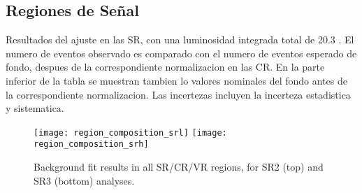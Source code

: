 


\subsection{Regiones de Señal}


\begin{table}[!htbp]
  \centering

  \caption{Resultados del ajuste en las SR, con una luminosidad integrada total de 20.3 \ifb.
    El numero de eventos observado es comparado con el numero de eventos esperado de fondo, despues de la correspondiente
    normalizacion en las CR. En la parte inferior de la tabla se muestran tambien lo valores nominales del fondo antes de
    la correspondiente normalizacion. Las incertezas incluyen la incerteza estadistica y sistematica.}
  \label{tab:fit_result_sr}

  

\end{table}


\begin{figure}[!htbp]
  \centering

  \texttt{[image: region\_composition\_srl]}
  \texttt{[image: region\_composition\_srh]}

  \caption{Background fit results in all SR/CR/VR regions, for SR2 (top) and SR3 (bottom) analyses.}
  \label{fig:fit_region_composition}

\end{figure}


